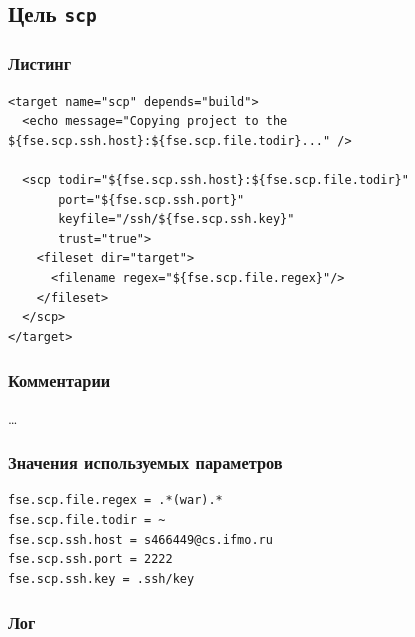 \subsection{Цель \texttt{scp}}

\subsubsection{Листинг}

\begin{lstlisting}[caption={Часть содержимого файла \texttt{build.xml}},captionpos=b]
<target name="scp" depends="build">
  <echo message="Copying project to the ${fse.scp.ssh.host}:${fse.scp.file.todir}..." />

  <scp todir="${fse.scp.ssh.host}:${fse.scp.file.todir}"
       port="${fse.scp.ssh.port}"
       keyfile="/ssh/${fse.scp.ssh.key}"
       trust="true">
    <fileset dir="target">
      <filename regex="${fse.scp.file.regex}"/>
    </fileset>
  </scp>
</target>
\end{lstlisting}

\subsubsection{Комментарии}

\dots

\subsubsection{Значения используемых параметров}

\begin{lstlisting}[language=Properties,caption={Часть содержимого файла \texttt{build.properties}},captionpos=b]
fse.scp.file.regex = .*(war).*
fse.scp.file.todir = ~
fse.scp.ssh.host = s466449@cs.ifmo.ru
fse.scp.ssh.port = 2222
fse.scp.ssh.key = .ssh/key
\end{lstlisting}

\subsubsection{Лог}

